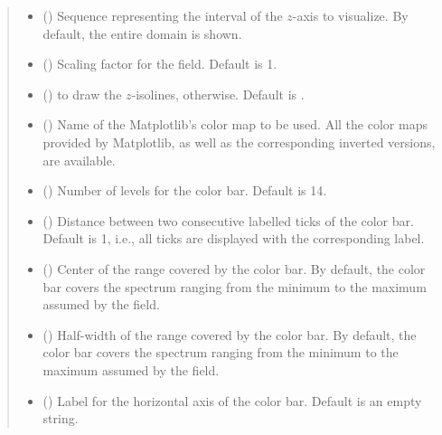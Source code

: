 \documentclass[letterpaper,10pt,english]{sphinxmanual}
\begin{document}
\begin{fulllineitems}
\begin{quote}
\begin{description}
\begin{itemize}
\item {} 
 () \textendash{} Sequence representing the interval of the \(z\)-axis to visualize.
By default, the entire domain is shown.

\item {} 
 () \textendash{} Scaling factor for the field. Default is 1.

\item {} 
 () \textendash{}  to draw the \(z\)-isolines,  otherwise. Default is .

\item {} 
 () \textendash{} Name of the Matplotlib’s color map to be used. All the color maps provided by Matplotlib,
as well as the corresponding inverted versions, are available.

\item {} 
 () \textendash{} Number of levels for the color bar. Default is 14.

\item {} 
 () \textendash{} Distance between two consecutive labelled ticks of the color bar. Default is 1, i.e.,
all ticks are displayed with the corresponding label.

\item {} 
 () \textendash{} Center of the range covered by the color bar. By default, the color bar covers the spectrum
ranging from the minimum to the maximum assumed by the field.

\item {} 
 () \textendash{} Half-width of the range covered by the color bar. By default, the color bar covers the spectrum
ranging from the minimum to the maximum assumed by the field.

\item {} 
 () \textendash{} Label for the horizontal axis of the color bar. Default is an empty string.


\end{itemize}
\end{description}
\end{quote}
\end{fulllineitems}
\end{document}
